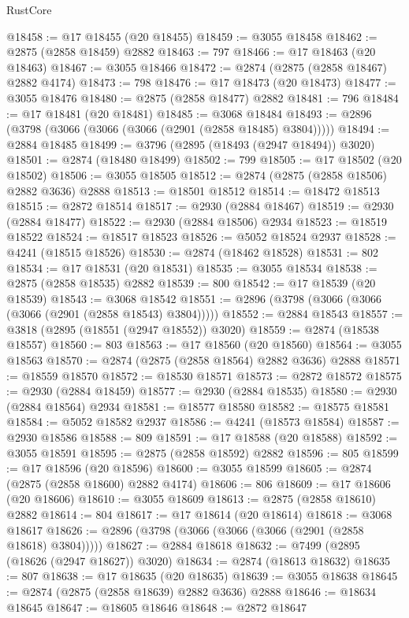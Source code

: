 \begin{lexlean}{RustCore}
\begin{coremodule}
@18458 := @17 @18455 (@20 @18455)
@18459 := @3055 @18458
@18462 := @2875 (@2858 @18459) @2882
@18463 := 797
@18466 := @17 @18463 (@20 @18463)
@18467 := @3055 @18466
@18472 := @2874 (@2875 (@2858 @18467) @2882 @4174)
@18473 := 798
@18476 := @17 @18473 (@20 @18473)
@18477 := @3055 @18476
@18480 := @2875 (@2858 @18477) @2882
@18481 := 796
@18484 := @17 @18481 (@20 @18481)
@18485 := @3068 @18484
@18493 := @2896 (@3798 (@3066 (@3066 (@3066 (@2901 (@2858 @18485) @3804)))))
@18494 := @2884 @18485
@18499 := @3796 (@2895 (@18493 (@2947 @18494)) @3020)
@18501 := @2874 (@18480 @18499)
@18502 := 799
@18505 := @17 @18502 (@20 @18502)
@18506 := @3055 @18505
@18512 := @2874 (@2875 (@2858 @18506) @2882 @3636) @2888
@18513 := @18501 @18512
@18514 := @18472 @18513
@18515 := @2872 @18514
@18517 := @2930 (@2884 @18467)
@18519 := @2930 (@2884 @18477)
@18522 := @2930 (@2884 @18506) @2934
@18523 := @18519 @18522
@18524 := @18517 @18523
@18526 := @5052 @18524 @2937
@18528 := @4241 (@18515 @18526)
@18530 := @2874 (@18462 @18528)
@18531 := 802
@18534 := @17 @18531 (@20 @18531)
@18535 := @3055 @18534
@18538 := @2875 (@2858 @18535) @2882
@18539 := 800
@18542 := @17 @18539 (@20 @18539)
@18543 := @3068 @18542
@18551 := @2896 (@3798 (@3066 (@3066 (@3066 (@2901 (@2858 @18543) @3804)))))
@18552 := @2884 @18543
@18557 := @3818 (@2895 (@18551 (@2947 @18552)) @3020)
@18559 := @2874 (@18538 @18557)
@18560 := 803
@18563 := @17 @18560 (@20 @18560)
@18564 := @3055 @18563
@18570 := @2874 (@2875 (@2858 @18564) @2882 @3636) @2888
@18571 := @18559 @18570
@18572 := @18530 @18571
@18573 := @2872 @18572
@18575 := @2930 (@2884 @18459)
@18577 := @2930 (@2884 @18535)
@18580 := @2930 (@2884 @18564) @2934
@18581 := @18577 @18580
@18582 := @18575 @18581
@18584 := @5052 @18582 @2937
@18586 := @4241 (@18573 @18584)
@18587 := @2930 @18586
@18588 := 809
@18591 := @17 @18588 (@20 @18588)
@18592 := @3055 @18591
@18595 := @2875 (@2858 @18592) @2882
@18596 := 805
@18599 := @17 @18596 (@20 @18596)
@18600 := @3055 @18599
@18605 := @2874 (@2875 (@2858 @18600) @2882 @4174)
@18606 := 806
@18609 := @17 @18606 (@20 @18606)
@18610 := @3055 @18609
@18613 := @2875 (@2858 @18610) @2882
@18614 := 804
@18617 := @17 @18614 (@20 @18614)
@18618 := @3068 @18617
@18626 := @2896 (@3798 (@3066 (@3066 (@3066 (@2901 (@2858 @18618) @3804)))))
@18627 := @2884 @18618
@18632 := @7499 (@2895 (@18626 (@2947 @18627)) @3020)
@18634 := @2874 (@18613 @18632)
@18635 := 807
@18638 := @17 @18635 (@20 @18635)
@18639 := @3055 @18638
@18645 := @2874 (@2875 (@2858 @18639) @2882 @3636) @2888
@18646 := @18634 @18645
@18647 := @18605 @18646
@18648 := @2872 @18647

\end{coremodule}
\end{lexlean}
